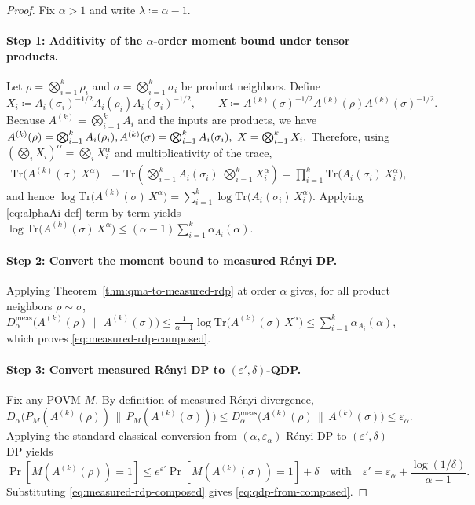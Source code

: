 \documentclass[11pt]{article}
\def\Tr{\mathrm{Tr}}
\theoremstyle{plain}
\theoremstyle{remark}
\begin{document}
\begin{proof}
Fix $\alpha>1$ and write $\lambda\coloneqq\alpha-1$.

\paragraph{Step 1: Additivity of the $\alpha$-order moment bound under tensor products.}
Let $\rho=\bigotimes_{i=1}^k\rho_i$ and $\sigma=\bigotimes_{i=1}^k\sigma_i$ be product neighbors.
Define
\[
X_i \coloneqq A_i(\sigma_i)^{-1/2}A_i(\rho_i)A_i(\sigma_i)^{-1/2},
\qquad
X \coloneqq A^{(k)}(\sigma)^{-1/2}A^{(k)}(\rho)A^{(k)}(\sigma)^{-1/2}.
\]
Because $A^{(k)}= \bigotimes_{i=1}^k A_i$ and the inputs are products, we have 
$
A^{(k)}(\rho)=\bigotimes_{i=1}^k A_i(\rho_i),
\\
A^{(k)}(\sigma)=\bigotimes_{i=1}^k A_i(\sigma_i),
\
X=\bigotimes_{i=1}^k X_i.
$
Therefore, using $(\bigotimes_i X_i)^\alpha=\bigotimes_i X_i^\alpha$ and multiplicativity of the
trace,
\begin{align*}
\Tr\!\big(A^{(k)}(\sigma)\,X^{\alpha}\big)
&=
\Tr\!\left(\bigotimes_{i=1}^k A_i(\sigma_i)\;\bigotimes_{i=1}^k X_i^{\alpha}\right)
=
\prod_{i=1}^k \Tr\!\big(A_i(\sigma_i)\,X_i^{\alpha}\big),
\end{align*}
and hence
$
\log \Tr\!\big(A^{(k)}(\sigma)\,X^{\alpha}\big)
=
\sum_{i=1}^k \log \Tr\!\big(A_i(\sigma_i)\,X_i^{\alpha}\big).
$
Applying \eqref{eq:alphaAi-def} term-by-term yields \\
$
\log \Tr\!\big(A^{(k)}(\sigma)\,X^{\alpha}\big)
\le
(\alpha-1)\sum_{i=1}^k \alpha_{A_i}(\alpha).
$


\paragraph{Step 2: Convert the moment bound to measured R\'enyi DP.}
Applying Theorem~\ref{thm:qma-to-measured-rdp} at order $\alpha$ gives, for all product
neighbors $\rho\sim\sigma$, \\
$
D^{\mathrm{meas}}_\alpha\!\big(A^{(k)}(\rho)\,\|\,A^{(k)}(\sigma)\big)
\le
\frac{1}{\alpha-1}\log \Tr\!\big(A^{(k)}(\sigma)\,X^\alpha\big)
\le
\sum_{i=1}^k \alpha_{A_i}(\alpha),
$
which proves \eqref{eq:measured-rdp-composed}.

\paragraph{Step 3: Convert measured R\'enyi DP to $(\varepsilon',\delta)$-QDP.}
Fix any POVM $M$. By definition of measured R\'enyi divergence,
\[
D_\alpha\!\big(P_M(A^{(k)}(\rho))\,\|\,P_M(A^{(k)}(\sigma))\big)
\le
D^{\mathrm{meas}}_\alpha\!\big(A^{(k)}(\rho)\,\|\,A^{(k)}(\sigma)\big)
\le
\varepsilon_\alpha.
\]
Applying the standard classical conversion from $(\alpha,\varepsilon_\alpha)$-R\'enyi DP to
$(\varepsilon',\delta)$-DP yields
\[
\Pr[M(A^{(k)}(\rho))=1]
\le
e^{\varepsilon'}\Pr[M(A^{(k)}(\sigma))=1]+\delta
\quad\text{with}\quad
\varepsilon'=\varepsilon_\alpha+\frac{\log(1/\delta)}{\alpha-1}.
\]
Substituting \eqref{eq:measured-rdp-composed} gives \eqref{eq:qdp-from-composed}.
\end{proof}
\end{document}
